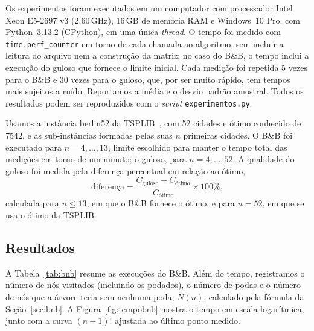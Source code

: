 \documentclass[12pt,a4paper]{article}
\begin{document}
Os experimentos foram executados em um computador com processador Intel Xeon E5-2697 v3 (2,60\,GHz), 16\,GB de memória RAM e Windows~10 Pro, com Python~3.13.2 (CPython), em uma única \emph{thread}. O tempo foi medido com \texttt{time.perf\_counter} em torno de cada chamada ao algoritmo, sem incluir a leitura do arquivo nem a construção da matriz; no caso do B\&B, o tempo inclui a execução do guloso que fornece o limite inicial. Cada medição foi repetida 5 vezes para o B\&B e 30 vezes para o guloso, que, por ser muito rápido, tem tempos mais sujeitos a ruído. Reportamos a média e o desvio padrão amostral. Todos os resultados podem ser reproduzidos com o \emph{script} \texttt{experimentos.py}.

Usamos a instância berlin52 da TSPLIB~\cite{reinelt1991}, com 52 cidades e ótimo conhecido de 7542, e as sub-instâncias formadas pelas suas $n$ primeiras cidades. O B\&B foi executado para $n = 4, \dots, 13$, limite escolhido para manter o tempo total das medições em torno de um minuto; o guloso, para $n = 4, \dots, 52$. A qualidade do guloso foi medida pela diferença percentual em relação ao ótimo,
\[
  \text{diferença} = \frac{C_{\text{guloso}} - C_{\text{ótimo}}}{C_{\text{ótimo}}} \times 100\%,
\]
calculada para $n \le 13$, em que o B\&B fornece o ótimo, e para $n = 52$, em que se usa o ótimo da TSPLIB.

\subsection{Resultados}

A Tabela~\ref{tab:bnb} resume as execuções do B\&B. Além do tempo, registramos o número de nós visitados (incluindo os podados), o número de podas e o número de nós que a árvore teria sem nenhuma poda, $N(n)$, calculado pela fórmula da Seção~\ref{sec:bnb}. A Figura~\ref{fig:tempobnb} mostra o tempo em escala logarítmica, junto com a curva $(n-1)!$ ajustada ao último ponto medido.
\end{document}
